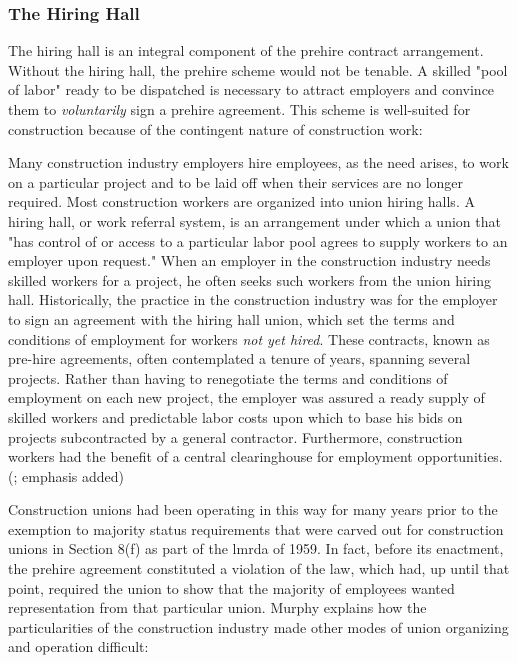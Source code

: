 \documentclass[12pt]{article}
\renewenvironment{quote}
  {\list{}{\leftmargin=\parindent\rightmargin=0pt}%
   \item\relax}
  {\endlist}
\begin{document}
\subsubsection{The Hiring Hall}

The hiring hall is an integral component of the prehire contract arrangement. Without the hiring hall, the prehire scheme would not be tenable. A skilled "pool of labor" ready to be dispatched is necessary to attract employers and convince them to \emph{voluntarily} sign a prehire agreement. This scheme is well-suited for construction because of the contingent nature of construction work:

\begin{quote}
Many construction industry employers hire employees, as the need arises, to work on a particular project and to be laid off when their services are no longer required. Most construction workers are organized into union hiring halls. A hiring hall, or work referral system, is an arrangement under which a union that "has control of or access to a particular labor pool agrees to supply workers to an employer upon request." When an employer in the construction industry needs skilled workers for a project, he often seeks such workers from the union hiring hall. Historically, the practice in the construction industry was for the employer to sign an agreement with the hiring hall union, which set the terms and conditions of employment for workers \textit{not yet hired}. These contracts, known as pre-hire agreements, often contemplated a tenure of years, spanning several projects. Rather than having to renegotiate the terms and conditions of employment on each new project, the employer was assured a ready supply of skilled workers and predictable labor costs upon which to base his bids on projects subcontracted by a general contractor. Furthermore, construction workers had the benefit of a central clearinghouse for employment opportunities. (\cite[1014–15]{murphyPreHireAgreementsSection1982}; emphasis added)
\end{quote}

Construction unions had been operating in this way for many years prior to the exemption to majority status requirements that were carved out for construction unions in Section 8(f) as part of the \acrshort{lmrda} of 1959. In fact, before its enactment, the prehire agreement constituted a violation of the law, which had, up until that point, required the union to show that the majority of employees wanted representation from that particular union. Murphy explains how the particularities of the construction industry made other modes of union organizing and operation difficult:
\end{document}
